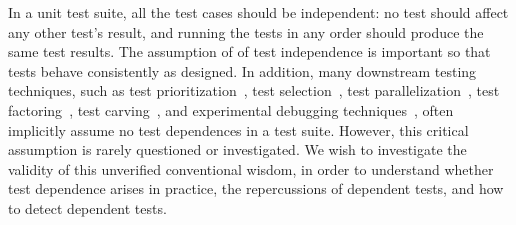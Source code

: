 In a unit test suite, all the test cases should be independent:
no test should affect any other test's result, and
running the tests in any order should produce the same test results.
The assumption of of test independence 
is important so that tests behave consistently
as designed. In addition, 
many downstream testing techniques, such as test
prioritization~\cite{Elbaum:2000:PTC:347324.348910, Kim:2002:HTP:581339.581357, Rummel:2005:TPR:1066677.1067016, Srivastava:2002:EPT:566172.566187, Jiang:2009:ART},
test selection~\cite{harroldetal:OOPSLA:2001, Orso:2004:SRT,
Briand:2009:ART, Zhang:2012:RMT},
test parallelization~\cite{Misailovic:2007, SPLAT},
test factoring~\cite{Saff:2005}, test carving~\cite{Elbaum:2006},
and experimental debugging techniques~\cite{Zeller:2002, Steimann:2013},
often implicitly assume no test dependences in
a test suite. 
However, this critical assumption is
rarely questioned or investigated.
We wish to investigate the validity of this unverified conventional wisdom,
in order to understand whether test dependence arises in practice, 
the repercussions of dependent tests, and how to 
detect dependent tests.

